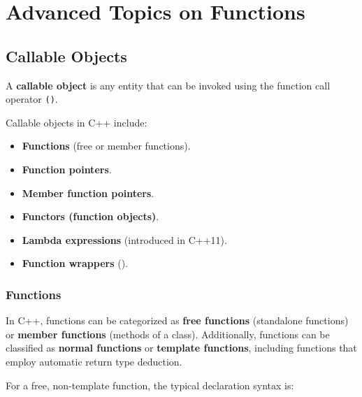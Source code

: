 \chapter{Advanced Topics on Functions}

\vspace{-1em}

\section{Callable Objects}

\vspace{-0.5em}

A \textbf{callable object} is any entity that can be invoked using the function call operator \texttt{()}.

Callable objects in C++ include:

\vspace{-0.7em}

\begin{multicols}{2}
\begin{itemize}
    \item \textbf{Functions} (free or member functions).
    \item \textbf{Function pointers}.
    \item \textbf{Member function pointers}.
    \item \textbf{Functors (function objects)}.
    \item \textbf{Lambda expressions} (introduced in C++11).
    \item \textbf{Function wrappers} ().
\end{itemize}
\end{multicols}

\vspace{-1.5em}

\subsection{Functions}

In C++, functions can be categorized as \textbf{free functions} (standalone functions) or \textbf{member functions} (methods of a class). Additionally, functions can be classified as \textbf{normal functions} or \textbf{template functions}, including functions that employ automatic return type deduction.

For a free, non-template function, the typical declaration syntax is:

\vspace{-0.5em}

